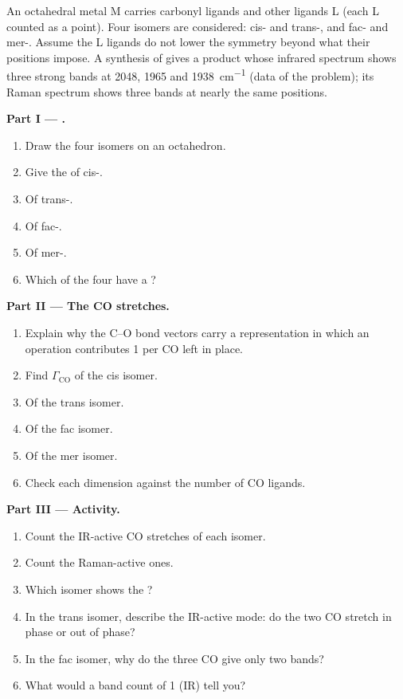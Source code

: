 \begin{problem}
\label{pb:b3:group-theory-applied:1}
An octahedral metal M carries carbonyl ligands and other ligands L (each L
counted as a point). Four isomers are considered: cis- and
trans-, and fac- and mer-. Assume the L ligands do
not lower the symmetry beyond what their positions impose. A synthesis of
 gives a product whose infrared spectrum shows three strong
bands at 2048, 1965 and \qty{1938}{cm^{-1}} (data of the problem); its Raman
spectrum shows three bands at nearly the same positions.

\medskip\noindent\textbf{Part I --- .}
\begin{enumerate}
  \item Draw the four isomers on an octahedron.
  \item Give the  of cis-.
  \item Of trans-.
  \item Of fac-.
  \item Of mer-.
  \item Which of the four have a ?
\end{enumerate}

\medskip\noindent\textbf{Part II --- The CO stretches.}
\begin{enumerate}[resume]
  \item Explain why the C--O bond vectors carry a representation in which an
        operation contributes 1 per CO left in place.
  \item Find $\Gamma_{\mathrm{CO}}$ of the cis isomer.
  \item Of the trans isomer.
  \item Of the fac isomer.
  \item Of the mer isomer.
  \item Check each dimension against the number of CO ligands.
\end{enumerate}

\medskip\noindent\textbf{Part III --- Activity.}
\begin{enumerate}[resume]
  \item Count the IR-active CO stretches of each isomer.
  \item Count the Raman-active ones.
  \item Which isomer shows the ?
  \item In the trans isomer, describe the IR-active mode: do the two CO
        stretch in phase or out of phase?
  \item In the fac isomer, why do the three CO give only two bands?
  \item What would a band count of 1 (IR) tell you?
\end{enumerate}


\end{problem}
